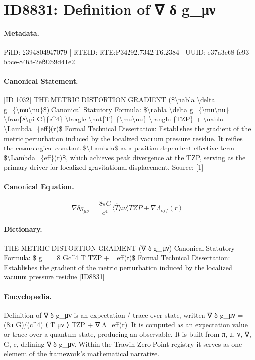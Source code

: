 \section*{ID8831: Definition of ∇ δ g\_μν}
\paragraph{Metadata.}
PiID: 2394804947079 | RTEID: RTE:P34292.7342:T6.2384 | UUID: e37a3e68-fe93-55ce-8463-2ef9259d41e2

\paragraph{Canonical Statement.}
[ID 1032] THE METRIC DISTORTION GRADIENT (\$\textbackslash{}nabla \textbackslash{}delta g\_\{\textbackslash{}mu\textbackslash{}nu\}\$) Canonical Statutory Formula: \$\textbackslash{}nabla \textbackslash{}delta g\_\{\textbackslash{}mu\textbackslash{}nu\} = \textbackslash{}frac\{8\textbackslash{}pi G\}\{c\textasciicircum{}4\} \textbackslash{}langle \textbackslash{}hat\{T\} \{\textbackslash{}mu\textbackslash{}nu\} \textbackslash{}rangle \{TZP\} + \textbackslash{}nabla \textbackslash{}Lambda\_\{eff\}(r)\$ Formal Technical Dissertation: Establishes the gradient of the metric perturbation induced by the localized vacuum pressure residue. It reifies the cosmological constant \$\textbackslash{}Lambda\$ as a position-dependent effective term \$\textbackslash{}Lambda\_\{eff\}(r)\$, which achieves peak divergence at the TZP, serving as the primary driver for localized gravitational displacement. Source: [1]

\paragraph{Canonical Equation.}
\[
\nabla \delta g_{\mu\nu} = \frac{8\pi G}{c^4} \langle \hat{T} {\mu\nu} \rangle {TZP} + \nabla \Lambda_{eff}(r)
\]

\paragraph{Dictionary.}
THE METRIC DISTORTION GRADIENT (∇ δ g\_μν) Canonical Statutory Formula: \$ g\_ = 8 Gc\textasciicircum{}4 T TZP + \_eff(r)\$ Formal Technical Dissertation: Establishes the gradient of the metric perturbation induced by the localized vacuum pressure residue [ID8831]

\paragraph{Encyclopedia.}
Definition of ∇ δ g\_μν is an expectation / trace over state, written ∇ δ g\_μν = (8π G)/(c\textasciicircum{}4) ⟨ T μν ⟩ TZP + ∇ Λ\_eff(r). It is computed as an expectation value or trace over a quantum state, producing an observable. It is built from π, μ, ν, ∇, G, c, defining ∇ δ g\_μν. Within the Trawin Zero Point registry it serves as one element of the framework's mathematical narrative.
